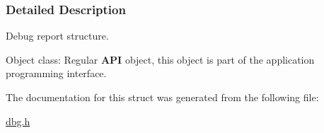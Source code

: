 \subsubsection{Detailed Description}
Debug report structure. 

\begin{DoxyParagraph}{Object class\-:}
Regular {\bfseries A\-P\-I} object, this object is part of the application programming interface. 
\end{DoxyParagraph}


The documentation for this struct was generated from the following file\-:\begin{DoxyCompactItemize}
\item 
\hyperlink{dbg_8h}{dbg.\-h}\end{DoxyCompactItemize}
